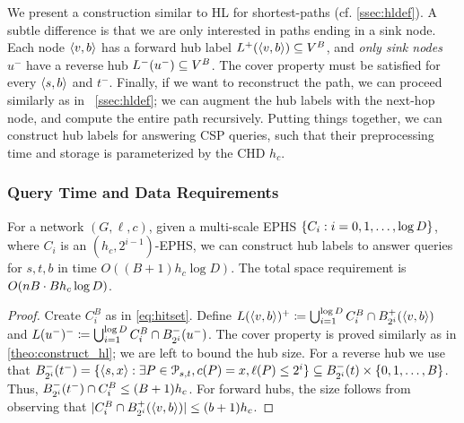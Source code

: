 We present a construction similar to HL for shortest-paths (cf. \cref{ssec:hldef}).
A subtle difference is that we are only interested in paths ending in a sink node.
Each node $\pp{v,b}$ has a forward hub label $\Lf(\pp{v,b})\subseteq V^B$, and \emph{only sink nodes} $u^-$ have a reverse hub $\Lb(u^-)\subseteq V^B$.
The cover property must be satisfied for every $\pp{s,b}$ and $t^-$.
Finally, if we want to reconstruct the path, we can proceed similarly as in ~\cref{ssec:hldef}; we can augment the hub labels with the next-hop node, and compute the entire path recursively.
Putting things together, we can construct hub labels for answering CSP queries, such that their preprocessing time and storage is parameterized by the CHD $h_c$.

\subsubsection{Query Time and Data Requirements}

\begin{theorem}
\label{theo:HLeff}
For a network $(G,\ell,c)$, given a multi-scale EPHS $\crl*{C_i:i=0,1,\ldots,\log D}$, where $C_i$ is an $(h_c,2^{i-1})$-EPHS, we can construct hub labels 
to answer queries for $s,t,b$ in time $O((B+1) h_c\log D)$.
The total space requirement is $\Or(nB \cdot Bh_c\log D)$.
\end{theorem}
\begin{proof}
Create $C_i^B$ as in \cref{eq:hitset}.
Define $L(\pp{v,b})^+ \defeq \bigcup_{i=1}^{\log D} C_i^B\cap \Bf_{2^i}(\pp{v,b})$ and $L(u^-)^-  \defeq \bigcup_{i=1}^{\log D} C_i^B\cap \Bb_{2^i}(u^-)$.
The cover property is proved similarly as in \cref{theo:construct_hl}; we are left to bound the hub size.
For a reverse hub we use that $\Bb_{2^i}(t^-) = \{\pp{s,x}: \exists P\in \Pst, c(P)=x, \ell(P)\leq 2^i\}
\subseteq \Bb_{2^i}(t)\times \{0,1,\ldots,B\}$.
Thus, $\Bb_{2^i}(t^-)\cap C_i^B\leq (B+1)h_c$.
For forward hubs, the size follows from observing that $ \card{C_i^B\cap \Bf_{2^i}(\pp{v,b})}\leq (b+1)h_c$.
\end{proof}
